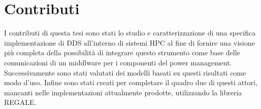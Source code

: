 \section{Contributi}
I contributi di questa tesi sono stati lo studio e caratterizzazione di una specifica implementazione di DDS all'interno di sistemi HPC al fine di fornire una visione più completa della possibilità di integrare questo strumento come base delle comunicazioni di un middlware per i componenti del power management. Successivamente sono stati valutati dei modelli basati su questi risultati come modo d'uso. Infine sono stati creati per completare il quadro due di questi attori, mancanti nelle implementazioni attualmente prodotte, utilizzando la libreria REGALE.






